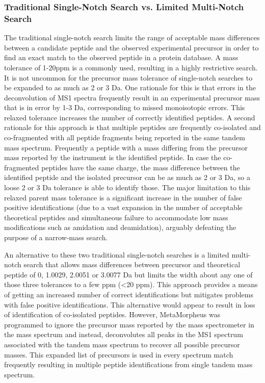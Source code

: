 \documentclass[journal=jprobs,manuscript=article]{achemso}
\begin{document}
\subsubsection{Traditional Single-Notch Search vs. Limited Multi-Notch Search}

The traditional single-notch search limits the range of acceptable mass differences between a candidate peptide and the observed experimental precursor in order to find an exact match to the observed peptide in a protein database.
A mass tolerance of 1-20ppm is a commonly used, resulting in a highly restrictive search.
It is not uncommon for the precursor mass tolerance of single-notch searches to be expanded to as much as 2 or 3 Da.
One rationale for this is that errors in the deconvolution of MS1 spectra frequently result in an experimental precursor mass that is in error by 1-3 Da, corresponding to missed monoisotopic errors.
This relaxed tolerance increases the number of correctly identified peptides.
A second rationale for this approach is that multiple peptides are frequently co-isolated and co-fragmented with all peptide fragments being reported in the same tandem mass spectrum.
Frequently a peptide with a mass differing from the precursor mass reported by the instrument is the identified peptide.
In case the co-fragmented peptides have the same charge, the mass difference between the identified peptide and the isolated precursor can be as much as 2 or 3 Da, so a loose 2 or 3 Da tolerance is able to identify those.
The major limitation to this relaxed parent mass tolerance is a significant increase in the number of false positive identifications (due to a vast expansion in the number of acceptable theoretical peptides and simultaneous failure to accommodate low mass modifications such as amidation and deamidation), arguably defeating the purpose of a narrow-mass search.
 
An alternative to these two traditional single-notch searches is a limited multi-notch search that allows mass differences between precursor and theoretical peptide of 0, 1.0029, 2.0051 or 3.0077 Da but limits the width about any one of those three tolerances to a few ppm (<20 ppm).
This approach provides a means of getting an increased number of correct identifications but mitigates problems with false positive identifications.
This alternative would appear to result in loss of identification of co-isolated peptides.
However, MetaMorpheus was programmed to ignore the precursor mass reported by the mass spectrometer in the mass spectrum and instead, deconvolutes all peaks in the MS1 spectrum associated with the tandem mass spectrum to recover all possible precursor masses.
This expanded list of precursors is used in every spectrum match frequently resulting in multiple peptide identifications from single tandem mass spectrum.  
\end{document}
